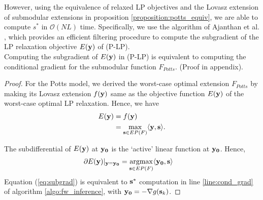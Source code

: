 However, using the equivalence of relaxed LP objectives and the Lovasz
extension of submodular extensions in proposition
\ref{proposition:potts_equiv}, we are able to compute $s^*$ in ${\mathcal
O}(NL)$ time. Specifically, we use the algorithm of
Ajanthan et al. \citep{ajanthan2017efficient}, which provides an efficient filtering procedure to compute the subgradient of the LP relaxation objective $E({\bf y})$ of (P-LP).\\
%
\vspace{-0.5cm}
{\proposition Computing the subgradient of $E({\bf y})$ in (P-LP) is equivalent to computing the conditional gradient for the submodular function $F_{Potts}$. \label{proposition:subgrad}} 
\newline(Proof in appendix).
\begin{proof}
  For the Potts model, we derived the worst-case optimal extension $F_{Potts}$ by
  making its Lovasz extension $f({\bf y})$ same as the objective function
    $E({\bf y})$ of the worst-case optimal LP relaxation. Hence, we have
\begin{align}
    E({\bf y}) &= f({\bf y})  \nonumber \\
    {} &=  \max_{{\bf s} \in EP(F)} \langle {\bf y}, {\bf s} \rangle.\nonumber
\end{align}

The subdifferential of $E({\bf y})$ at $\bf y_0$ is the `active' linear function at $\bf y_0$. Hence,
\begin{align}
    \partial E({\bf y})|_{\bf y = y_0} &=  \argmax_{{\bf s} \in EP(F)} \langle {\bf y_0}, {\bf s} \rangle
    \label{eq:subgrad}
\end{align}
Equation (\ref{eq:subgrad}) is equivalent to ${\bf s}^*$ computation in line \ref{line:cond_grad} of algorithm \ref{algo:fw_inference}, with ${\bf y_0} = - \nabla g({\bf s}_k)$.
\end{proof}


